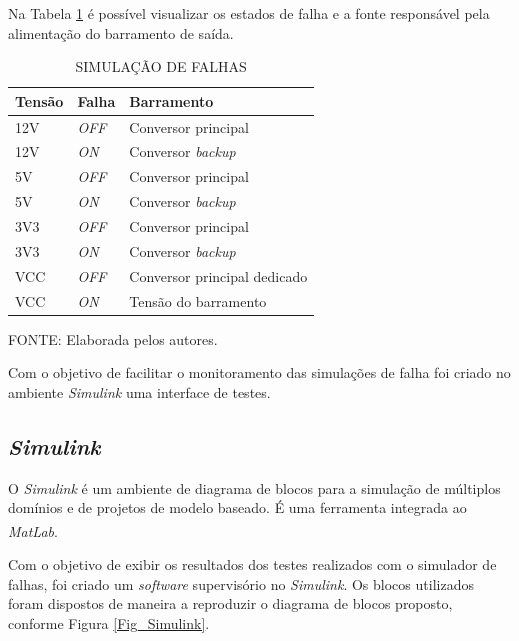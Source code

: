 \documentclass[
	12pt,				%
	openright,			%
	oneside,			%
	a4paper,			%
	english,			%
	french,				%
	spanish,			%
	brazil,				%
	oldfontcommands
	]{abntex2}
\begin{document}
	Na Tabela \ref{Tab_Simulador} é possível visualizar os estados de falha e a fonte responsável pela alimentação do barramento de saída.
	
	\begin{table}[th]
	\caption{SIMULAÇÃO DE FALHAS}
	\label{Tab_Simulador}
	\centering
		\begin{tabular}{p{1.5cm}|p{1.5cm}|p{5.5cm}}
			\textbf{Tensão} & \textbf{Falha} & \textbf{Barramento}\\
			\hline
			12V & \textit{OFF} & Conversor principal \\
			12V & \textit{ON} & Conversor \textit{backup} \\
			5V & \textit{OFF} & Conversor principal \\
			5V & \textit{ON} & Conversor \textit{backup} \\
			3V3 & \textit{OFF} & Conversor principal \\
			3V3 & \textit{ON} & Conversor \textit{backup} \\
			VCC & \textit{OFF} & Conversor principal dedicado \\
			VCC & \textit{ON} & Tensão do barramento \\
		\end{tabular}	
	
	\begin{small}
	\vspace{3pt}
		FONTE: Elaborada pelos autores.
	\end{small}
	\end{table}
	\pagebreak
	
	Com o objetivo de facilitar o monitoramento das simulações de falha foi criado no ambiente \textit{Simulink} uma interface de testes.
	
\subsection[Simulink]{\textit{Simulink}}

	O \textit{Simulink} é um ambiente de diagrama de blocos para a simulação de múltiplos domínios e de projetos de modelo baseado. É uma ferramenta integrada ao \textit{MatLab}.\textsuperscript{\cite{Simulink}}
	
	Com o objetivo de exibir os resultados dos testes realizados com o simulador de falhas, foi criado um \textit{software} supervisório no \textit{Simulink}. Os blocos utilizados foram dispostos de maneira a reproduzir o diagrama de blocos proposto, conforme Figura \ref{Fig_Simulink}.
	
\end{document}
